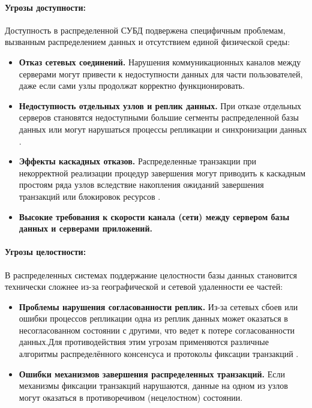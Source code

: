 \paragraph{Угрозы доступности:}

Доступность в распределенной СУБД подвержена специфичным проблемам, вызванным распределением данных и отсутствием единой физической среды:

\begin{itemize} 
    \item \textbf{Отказ сетевых соединений.} Нарушения коммуникационных каналов между серверами могут привести к недоступности данных для части пользователей, даже если сами узлы продолжат корректно функционировать\autocite{Karpova2009}.
    \item \textbf{Недоступность отдельных узлов и реплик данных.} При отказе отдельных серверов становятся недоступными большие сегменты распределенной базы данных или могут нарушаться процессы репликации и синхронизации данных \autocite{Tanenbaum}. 
    \item \textbf{Эффекты каскадных отказов.} Распределенные транзакции при некорректной реализации процедур завершения могут приводить к каскадным простоям ряда узлов вследствие накопления ожиданий завершения транзакций или блокировок ресурсов \autocite{IntroBD2014}. 
    \item \textbf{Высокие требования к скорости канала (сети) между сервером базы данных и серверами приложений.}
\end{itemize}

\paragraph{Угрозы целостности:}

В распределенных системах поддержание целостности базы данных становится технически сложнее из-за географической и сетевой удаленности ее частей:

\begin{itemize} 
    \item \textbf{Проблемы нарушения согласованности реплик.} Из-за сетевых сбоев или ошибки процессов репликации одна из реплик данных может оказаться в несогласованном состоянии с другими, что ведет к потере согласованности данных.Для противодействия этим угрозам применяются различные алгоритмы распределённого консенсуса и 
    протоколы фиксации транзакций \autocite{Tanenbaum}.
    \item \textbf{Ошибки механизмов завершения распределенных транзакций.} Если механизмы фиксации транзакций нарушаются, данные на одном из узлов могут оказаться в противоречивом (нецелостном) состоянии. 
\end{itemize}

